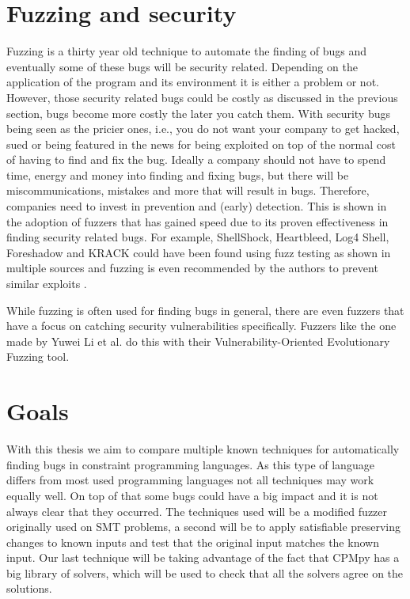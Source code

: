 \section{Fuzzing and security}
\label{intro:FussingSecurity}
Fuzzing is a thirty year old technique to automate the finding of bugs and eventually some of these bugs will be security related. Depending on the application of the program and its environment it is either a problem or not. However, those security related bugs could be costly as discussed in the previous section, bugs become more costly the later you 
catch them. With security bugs being seen as the pricier ones, i.e., you do not want your company to get hacked, sued or being featured in the news for being exploited on top of the normal cost of having to find and fix the bug. %
Ideally a company should not have to spend time, energy and money into finding and fixing bugs, but there will be miscommunications, mistakes and more that will result in bugs. Therefore, companies need to invest in prevention and (early) detection. This is shown in the adoption of fuzzers that has gained speed due to its proven effectiveness in finding security related bugs. For example, ShellShock, Heartbleed, Log4 Shell, Foreshadow and KRACK could have been found using fuzz testing as shown in multiple sources \cite{HeartbleedViaFuzzing, 34ForeshadowViaFuzz, ShellShockViaFuzzing, Log4ShellViaFuzzing} and fuzzing is even recommended by the authors to prevent similar exploits \cite{35ForeshadowFuzzRecom, 33KrackViaFuzz}.

While fuzzing is often used for finding bugs in general, there are even fuzzers that have a focus on catching security vulnerabilities specifically. Fuzzers like the one made by Yuwei Li et al. \cite{32V-Fuzz} do this with their Vulnerability-Oriented Evolutionary Fuzzing tool.

\section{Goals}
\label{intro:Goals}
With this thesis we aim to compare multiple known techniques for automatically finding bugs in constraint programming languages. As this type of language differs from most used programming languages not all techniques may work equally well. On top of that some bugs could have a big impact and it is not always clear that they occurred.
The techniques used will be a modified fuzzer originally used on SMT problems, a second will be to apply satisfiable preserving changes to known inputs and test that the original input matches the known input. Our last technique will be taking advantage of the fact that CPMpy has a big library of solvers, which will be used to check that all the solvers agree on the solutions.

